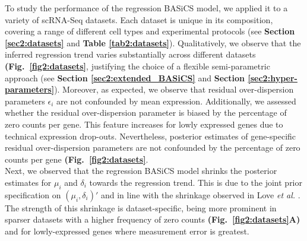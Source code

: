 To study the performance of the regression BASiCS model, we applied it to a variety of scRNA-Seq datasets. Each dataset is unique in its composition, covering a range of different cell types and experimental protocols (see \textbf{Section \ref{sec2:datasets}} and \textbf{Table \ref{tab2:datasets}}). Qualitatively, we observe that the inferred regression trend varies substantially across different datasets \textbf{(Fig.~\ref{fig2:datasets}}, justifying the choice of a flexible semi-parametric approach (see \textbf{Section \ref{sec2:extended_BASiCS}} and \textbf{Section \ref{sec2:hyper-parameters}}). Moreover, as expected, we observe that residual over-dispersion parameters $\epsilon_i$ are not confounded by mean expression. Additionally, we assessed whether the residual over-dispersion parameter is biased by the percentage of zero counts per gene. This feature increases for lowly expressed genes due to technical expression drop-outs. Nevertheless, posterior estimates of gene-specific residual over-dispersion parameters are not confounded by the percentage of zero counts per gene \textbf{(Fig.~\ref{fig2:datasets}}. \\

Next, we observed that the regression BASiCS model shrinks the posterior estimates for $\mu_i$ and $\delta_i$ towards the regression trend. This is due to the joint prior specification on $(\mu_i,\delta_i)'$ and in line with the shrinkage observed in Love \emph{et al.} \citep{Love2014}. The strength of this shrinkage is dataset-specific, being more prominent in sparser datasets with a higher frequency of zero counts \textbf{(Fig.~\ref{fig2:datasets}A)} and for lowly-expressed genes where measurement error is greatest. 

\newpage

